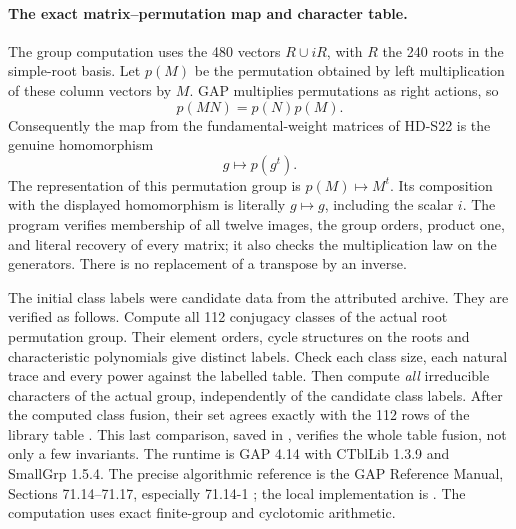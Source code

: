\paragraph{The exact matrix--permutation map and character table.}
The group computation uses the 480 vectors \(R\cup iR\), with \(R\)
the 240 roots in the simple-root basis. Let \(p(M)\) be the permutation
obtained by left multiplication of these column vectors by \(M\).
GAP multiplies permutations as right actions, so
\[
 p(MN)=p(N)p(M).
\]
Consequently the map from the fundamental-weight matrices of HD-S22 is
the genuine homomorphism
\[
                 g\longmapsto p(g^t).
\]
The representation of this permutation group is \(p(M)\mapsto M^t\).
Its composition with the displayed homomorphism is literally \(g\mapsto g\),
including the scalar \(i\). The program
 verifies membership of all twelve
images, the group orders, product one, and literal recovery of every
matrix; it also checks the multiplication law on the generators.
There is no replacement of a transpose by an inverse.

The initial class labels were candidate data from the attributed archive.
They are verified as follows. Compute all 112 conjugacy classes of the
actual root permutation group. Their element orders, cycle structures
on the roots and characteristic polynomials give distinct labels.
Check each class size, each natural trace and every power against the
labelled table. Then compute \emph{all} irreducible characters of the
actual group, independently of the candidate class labels. After the
computed class fusion, their set agrees exactly with the 112 rows of
the library table . This last comparison, saved in
, verifies the whole table fusion,
not only a few invariants. The runtime is GAP 4.14 with CTblLib 1.3.9
and SmallGrp 1.5.4. The precise algorithmic reference is the GAP
Reference Manual, Sections 71.14--71.17, especially 71.14-1
; the local implementation is
. The computation uses exact finite-group and
cyclotomic arithmetic.

